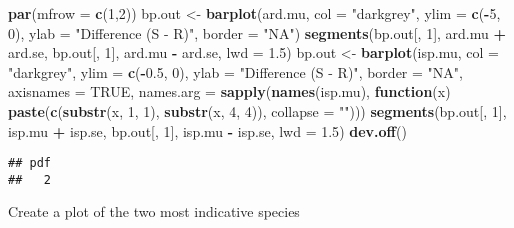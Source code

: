 \documentclass[]{article}
\newenvironment{Shaded}{\begin{snugshade}}{\end{snugshade}}
\newcommand{\KeywordTok}[1]{\textcolor[rgb]{0.13,0.29,0.53}{\textbf{#1}}}
\newcommand{\DataTypeTok}[1]{\textcolor[rgb]{0.13,0.29,0.53}{#1}}
\newcommand{\DecValTok}[1]{\textcolor[rgb]{0.00,0.00,0.81}{#1}}
\newcommand{\FloatTok}[1]{\textcolor[rgb]{0.00,0.00,0.81}{#1}}
\newcommand{\StringTok}[1]{\textcolor[rgb]{0.31,0.60,0.02}{#1}}
\newcommand{\OtherTok}[1]{\textcolor[rgb]{0.56,0.35,0.01}{#1}}
\newcommand{\ControlFlowTok}[1]{\textcolor[rgb]{0.13,0.29,0.53}{\textbf{#1}}}
\newcommand{\OperatorTok}[1]{\textcolor[rgb]{0.81,0.36,0.00}{\textbf{#1}}}
\newcommand{\NormalTok}[1]{#1}
\begin{document}
\begin{Shaded}
\begin{Highlighting}[]
\KeywordTok{par}\NormalTok{(}\DataTypeTok{mfrow =} \KeywordTok{c}\NormalTok{(}\DecValTok{1}\NormalTok{,}\DecValTok{2}\NormalTok{))}
\NormalTok{bp.out <-}\StringTok{ }\KeywordTok{barplot}\NormalTok{(ard.mu, }\DataTypeTok{col =} \StringTok{"darkgrey"}\NormalTok{, }\DataTypeTok{ylim =} \KeywordTok{c}\NormalTok{(}\OperatorTok{-}\DecValTok{5}\NormalTok{, }\DecValTok{0}\NormalTok{), }
                  \DataTypeTok{ylab =} \StringTok{"Difference (S - R)"}\NormalTok{, }\DataTypeTok{border =} \StringTok{"NA"}\NormalTok{)}
\KeywordTok{segments}\NormalTok{(bp.out[, }\DecValTok{1}\NormalTok{], ard.mu }\OperatorTok{+}\StringTok{ }\NormalTok{ard.se,}
\NormalTok{         bp.out[, }\DecValTok{1}\NormalTok{], ard.mu }\OperatorTok{-}\StringTok{ }\NormalTok{ard.se, }
         \DataTypeTok{lwd =} \FloatTok{1.5}\NormalTok{)}
\NormalTok{bp.out <-}\StringTok{ }\KeywordTok{barplot}\NormalTok{(isp.mu, }\DataTypeTok{col =} \StringTok{"darkgrey"}\NormalTok{, }\DataTypeTok{ylim =} \KeywordTok{c}\NormalTok{(}\OperatorTok{-}\FloatTok{0.5}\NormalTok{, }\DecValTok{0}\NormalTok{), }
                  \DataTypeTok{ylab =} \StringTok{"Difference (S - R)"}\NormalTok{, }\DataTypeTok{border =} \StringTok{"NA"}\NormalTok{,}
            \DataTypeTok{axisnames =} \OtherTok{TRUE}\NormalTok{, }
            \DataTypeTok{names.arg =} \KeywordTok{sapply}\NormalTok{(}\KeywordTok{names}\NormalTok{(isp.mu), }
                \ControlFlowTok{function}\NormalTok{(x) }
                                    \KeywordTok{paste}\NormalTok{(}\KeywordTok{c}\NormalTok{(}\KeywordTok{substr}\NormalTok{(x, }\DecValTok{1}\NormalTok{, }\DecValTok{1}\NormalTok{), }
                                            \KeywordTok{substr}\NormalTok{(x, }\DecValTok{4}\NormalTok{, }\DecValTok{4}\NormalTok{)), }\DataTypeTok{collapse =} \StringTok{""}\NormalTok{)))}
\KeywordTok{segments}\NormalTok{(bp.out[, }\DecValTok{1}\NormalTok{], isp.mu }\OperatorTok{+}\StringTok{ }\NormalTok{isp.se,}
\NormalTok{         bp.out[, }\DecValTok{1}\NormalTok{], isp.mu }\OperatorTok{-}\StringTok{ }\NormalTok{isp.se, }
         \DataTypeTok{lwd =} \FloatTok{1.5}\NormalTok{)}
\KeywordTok{dev.off}\NormalTok{()}
\end{Highlighting}
\end{Shaded}

\begin{verbatim}
## pdf 
##   2
\end{verbatim}

Create a plot of the two most indicative species
\end{document}
